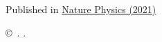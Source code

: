 \documentclass[12pt,a4paper]{article}
\def\paperlicenceurl{https://creativecommons.org/licenses/by/4.0/}
\begin{document}
{\begin{titlepage}
\vspace*{5.0cm}

\begin{center}
Published in  \href{https://doi.org/10.1038/s41567-022-01614-y}{Nature Physics (2021)}
\end{center}

\vspace{\fill}

{\footnotesize 
\centerline{\copyright~\papercopyright. \href{\paperlicenceurl}{\paperlicence}.}}


\end{titlepage}




\newpage
\setcounter{page}{2}
\mbox{~}












 }




\renewcommand{\thefootnote}{\arabic{footnote}}
\setcounter{footnote}{0}

\cleardoublepage




\pagestyle{plain} \setcounter{page}{1}
\end{document}
